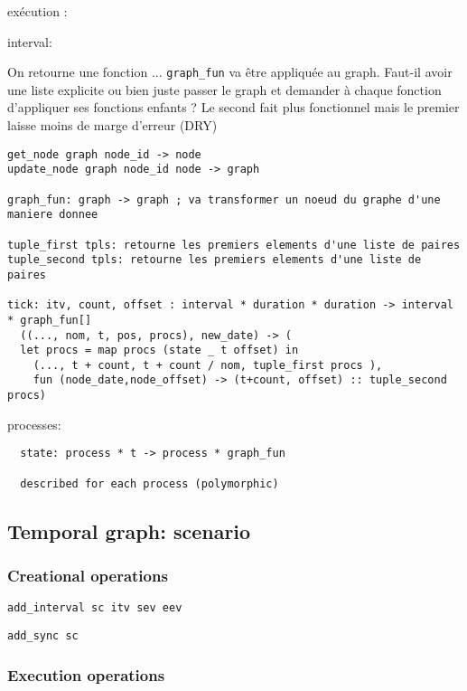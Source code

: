 \documentclass[applsci,article,submit,moreauthors,pdftex,10pt,a4paper]{mdpi}
\begin{document}
exécution : 

interval: 

On retourne une fonction ... \lstinline|graph_fun| va être appliquée au graph. Faut-il avoir une liste explicite ou bien juste passer le graph et demander à chaque fonction d'appliquer ses fonctions enfants ? Le second fait plus fonctionnel mais le premier laisse moins de marge d'erreur (DRY)
\begin{lstlisting}
get_node graph node_id -> node
update_node graph node_id node -> graph

graph_fun: graph -> graph ; va transformer un noeud du graphe d'une maniere donnee

tuple_first tpls: retourne les premiers elements d'une liste de paires
tuple_second tpls: retourne les premiers elements d'une liste de paires

tick: itv, count, offset : interval * duration * duration -> interval * graph_fun[]
  ((..., nom, t, pos, procs), new_date) -> (
  let procs = map procs (state _ t offset) in 
    (..., t + count, t + count / nom, tuple_first procs ),  
    fun (node_date,node_offset) -> (t+count, offset) :: tuple_second procs)

\end{lstlisting}

processes:
\begin{lstlisting}
  state: process * t -> process * graph_fun
  
  described for each process (polymorphic)
\end{lstlisting}

\subsection{Temporal graph: scenario}\label{sec.scenario}


\subsubsection{Creational operations}

\begin{lstlisting}
add_interval sc itv sev eev
\end{lstlisting}
\begin{lstlisting}
add_sync sc
\end{lstlisting}
\subsubsection{Execution operations}
\end{document}
